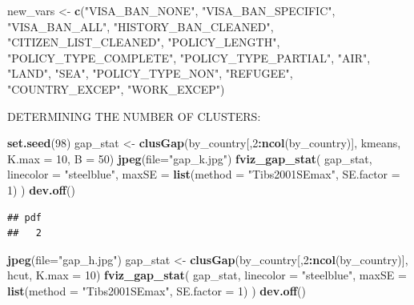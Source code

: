 \documentclass[]{article}
\newenvironment{Shaded}{\begin{snugshade}}{\end{snugshade}}
\newcommand{\DataTypeTok}[1]{\textcolor[rgb]{0.13,0.29,0.53}{#1}}
\newcommand{\DecValTok}[1]{\textcolor[rgb]{0.00,0.00,0.81}{#1}}
\newcommand{\KeywordTok}[1]{\textcolor[rgb]{0.13,0.29,0.53}{\textbf{#1}}}
\newcommand{\NormalTok}[1]{#1}
\newcommand{\OperatorTok}[1]{\textcolor[rgb]{0.81,0.36,0.00}{\textbf{#1}}}
\newcommand{\StringTok}[1]{\textcolor[rgb]{0.31,0.60,0.02}{#1}}
\begin{document}
\begin{Shaded}
\begin{Highlighting}[]
\NormalTok{new_vars <-}\StringTok{ }\KeywordTok{c}\NormalTok{(}\StringTok{"VISA_BAN_NONE"}\NormalTok{, }\StringTok{"VISA_BAN_SPECIFIC"}\NormalTok{, }\StringTok{"VISA_BAN_ALL"}\NormalTok{,}
          \StringTok{"HISTORY_BAN_CLEANED"}\NormalTok{, }\StringTok{"CITIZEN_LIST_CLEANED"}\NormalTok{, }\StringTok{"POLICY_LENGTH"}\NormalTok{,}
          \StringTok{"POLICY_TYPE_COMPLETE"}\NormalTok{, }\StringTok{"POLICY_TYPE_PARTIAL"}\NormalTok{, }\StringTok{"AIR"}\NormalTok{, }\StringTok{"LAND"}\NormalTok{, }\StringTok{"SEA"}\NormalTok{, }
          \StringTok{"POLICY_TYPE_NON"}\NormalTok{, }\StringTok{"REFUGEE"}\NormalTok{, }\StringTok{"COUNTRY_EXCEP"}\NormalTok{, }\StringTok{"WORK_EXCEP"}\NormalTok{)}
\end{Highlighting}
\end{Shaded}

DETERMINING THE NUMBER OF CLUSTERS:

\begin{Shaded}
\begin{Highlighting}[]
\KeywordTok{set.seed}\NormalTok{(}\DecValTok{98}\NormalTok{)}
\NormalTok{gap_stat <-}\StringTok{ }\KeywordTok{clusGap}\NormalTok{(by_country[,}\DecValTok{2}\OperatorTok{:}\KeywordTok{ncol}\NormalTok{(by_country)], kmeans, }\DataTypeTok{K.max =} \DecValTok{10}\NormalTok{, }\DataTypeTok{B =} \DecValTok{50}\NormalTok{)}
\KeywordTok{jpeg}\NormalTok{(}\DataTypeTok{file=}\StringTok{"gap_k.jpg"}\NormalTok{)}
\KeywordTok{fviz_gap_stat}\NormalTok{(}
\NormalTok{  gap_stat,}
  \DataTypeTok{linecolor =} \StringTok{"steelblue"}\NormalTok{,}
  \DataTypeTok{maxSE =} \KeywordTok{list}\NormalTok{(}\DataTypeTok{method =} \StringTok{"Tibs2001SEmax"}\NormalTok{, }\DataTypeTok{SE.factor =} \DecValTok{1}\NormalTok{)}
\NormalTok{)}
\KeywordTok{dev.off}\NormalTok{()}
\end{Highlighting}
\end{Shaded}

\begin{verbatim}
## pdf 
##   2
\end{verbatim}

\begin{Shaded}
\begin{Highlighting}[]
\KeywordTok{jpeg}\NormalTok{(}\DataTypeTok{file=}\StringTok{"gap_h.jpg"}\NormalTok{)}
\NormalTok{gap_stat <-}\StringTok{ }\KeywordTok{clusGap}\NormalTok{(by_country[,}\DecValTok{2}\OperatorTok{:}\KeywordTok{ncol}\NormalTok{(by_country)], hcut, }\DataTypeTok{K.max =} \DecValTok{10}\NormalTok{)}
\KeywordTok{fviz_gap_stat}\NormalTok{(}
\NormalTok{  gap_stat,}
  \DataTypeTok{linecolor =} \StringTok{"steelblue"}\NormalTok{,}
  \DataTypeTok{maxSE =} \KeywordTok{list}\NormalTok{(}\DataTypeTok{method =} \StringTok{"Tibs2001SEmax"}\NormalTok{, }\DataTypeTok{SE.factor =} \DecValTok{1}\NormalTok{)}
\NormalTok{)}
\KeywordTok{dev.off}\NormalTok{()}
\end{Highlighting}
\end{Shaded}
\end{document}
